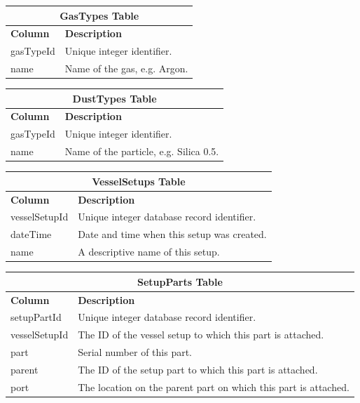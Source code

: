 \begin{table}[h!]
\centering
\begin{tabular}{l p{12cm}}
\multicolumn{2}{c}{\bf GasTypes Table} \\ \hline
{\bf Column} & {\bf Description}\\ \hline
gasTypeId & Unique integer identifier.\\ \hline
name & Name of the gas, e.g. Argon.\\ \hline
\end{tabular}
\end{table}

\begin{table}[h!]
\centering
\begin{tabular}{l p{12cm}}
\multicolumn{2}{c}{\bf DustTypes Table} \\ \hline
{\bf Column} & {\bf Description}\\ \hline
gasTypeId & Unique integer identifier.\\ \hline
name & Name of the particle, e.g. Silica 0.5.\\ \hline
\end{tabular}
\end{table}

\begin{table}[h!]
\centering
\begin{tabular}{l p{12cm}}
\multicolumn{2}{c}{\bf VesselSetups Table} \\ \hline
{\bf Column} & {\bf Description}\\ \hline
vesselSetupId & Unique integer database record identifier.\\ \hline
dateTime & Date and time when this setup was created.\\ \hline
name & A descriptive name of this setup.\\ \hline
\end{tabular}
\end{table}

\begin{table}[h!]
\centering
\begin{tabular}{l p{12cm}}
\multicolumn{2}{c}{\bf SetupParts Table} \\ \hline
{\bf Column} & {\bf Description}\\ \hline
setupPartId & Unique integer database record identifier.\\ \hline
vesselSetupId & The ID of the vessel setup to which this part is attached.\\ \hline
part & Serial number of this part.\\ \hline
parent & The ID of the setup part to which this part is attached.\\ \hline
port & The location on the parent part on which this part is attached.\\ \hline
\end{tabular}
\end{table}

